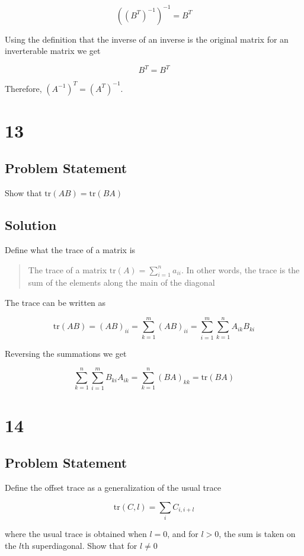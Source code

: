 \documentclass[11pt,a4paper,final]{article}
\begin{document}
$$
((B^T)^{-1})^{-1} = B^T
$$

Using the definition that the inverse of an inverse is the original matrix for an inverterable matrix we get

$$
B^T = B^T
$$

Therefore, \((A^{-1})^T = (A^T)^{-1}\).

\section{13}
\label{sec:org6b41d17}
\subsection{Problem Statement}
\label{sec:org4dc6120}
Show that \(\text{tr}(AB) = \text{tr}(BA)\)

\subsection{Solution}
\label{sec:org893e9f6}
Define what the trace of a matrix is

\begin{quote}
The trace of a matrix \(\text{tr}(A) = \sum_{i=1}^{n} a_{ii}\). In other words, the trace is the sum of the elements along
the main of the diagonal
\end{quote}

The trace can be written as

$$
\text{tr}(AB) = (AB)_{ii} = \sum_{k=1}^m (AB)_{ii} = \sum_{i=1}^m \sum_{k=1}^n A_{ik} B_{ki}
$$

Reversing the summations we get

$$
\sum_{k=1}^n \sum_{i=1}^m B_{ki} A_{ik} = \sum_{k=1}^n (BA)_{kk} = \text{tr}(BA)
$$

\section{14}
\label{sec:org6d44481}
\subsection{Problem Statement}
\label{sec:org9d4b4ea}
Define the offset trace as a generalization of the usual trace

$$
\text{tr}(C,l) = \sum_{i} C_{i,i+l}
$$

where the usual trace is obtained when \(l = 0\), and for \(l > 0\), the sum is taken on the \(l\text{th}\) superdiagonal. Show that
for \(l \ne 0\)
\end{document}
